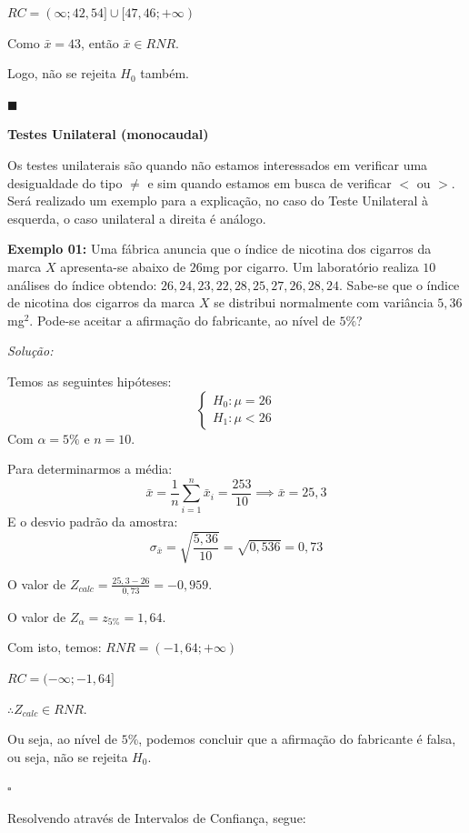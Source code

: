 \documentclass[oneside,a4paper,12pt]{article}
\begin{document}
$RC = (\infty; 42,54]\cup[47,46;+\infty)$

Como $\bar{x} = 43$, então $\bar{x} \in RNR$.

Logo, não se rejeita $H_0$ também.

\begin{flushright}
	$\blacksquare$
\end{flushright}


\textbf{Testes Unilateral (monocaudal)}

Os testes unilaterais são quando não estamos interessados em verificar uma desigualdade do tipo $\neq$ e sim quando estamos em busca de verificar $<$ ou $>$. Será realizado um exemplo para a explicação, no caso do Teste Unilateral à esquerda, o caso unilateral a direita é análogo.

\textbf{Exemplo 01:} Uma fábrica anuncia que o índice de nicotina dos cigarros da marca $X$ apresenta-se abaixo de $26$mg por cigarro. Um laboratório realiza $10$ análises do índice obtendo: $26,24,23,22,28,25,27,26,28,24$. Sabe-se que o índice de nicotina dos cigarros da marca $X$ se distribui normalmente com variância $5,36$mg$^2$. Pode-se aceitar a afirmação do fabricante, ao nível de $5\%$?

\textit{Solução:}

Temos as seguintes hipóteses:
$$\begin{cases}
	H_0:\mu = 26\\
	H_1:\mu < 26
\end{cases}
$$
Com $\alpha = 5\%$ e $n=10$.

Para determinarmos a média:
$$\bar{x} = \frac{1}{n}\sum_{i = 1}^n \bar{x}_i = \frac{253}{10} \implies \bar{x} = 25,3$$
E o desvio padrão da amostra:
$$\sigma_{\bar{x}} = \sqrt{\frac{5,36}{10}} = \sqrt{0,536} = 0,73$$

O valor de $Z_{calc} = \frac{25,3 - 26}{0,73} = -0,959$.

O valor de $Z_{\alpha} = z_{5\%} = 1,64$.

Com isto, temos:
$RNR = (-1,64; + \infty)$

$RC = (-\infty;-1,64]$

$\therefore Z_{calc} \in RNR$.

Ou seja, ao nível de $5\%$, podemos concluir que a afirmação do fabricante é falsa, ou seja, não se rejeita $H_0$.

\begin{flushright}
	$\square$
\end{flushright}

Resolvendo através de Intervalos de Confiança, segue:
\end{document}
